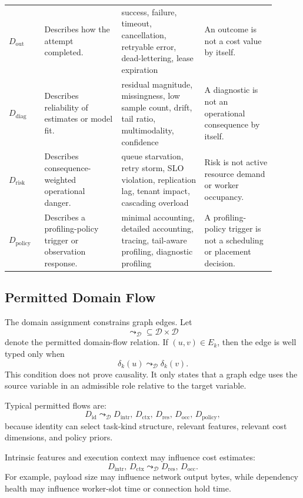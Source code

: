 \begin{longtable}{
p{0.12\linewidth}
p{0.26\linewidth}
p{0.28\linewidth}
p{0.24\linewidth}
}
$D_{\mathrm{out}}$ &
Describes how the attempt completed. &
success, failure, timeout, cancellation, retryable error, dead-lettering, lease
expiration &
An outcome is not a cost value by itself. \\

$D_{\mathrm{diag}}$ &
Describes reliability of estimates or model fit. &
residual magnitude, missingness, low sample count, drift, tail ratio,
multimodality, confidence &
A diagnostic is not an operational consequence by itself. \\

$D_{\mathrm{risk}}$ &
Describes consequence-weighted operational danger. &
queue starvation, retry storm, SLO violation, replication lag, tenant impact,
cascading overload &
Risk is not active resource demand or worker occupancy. \\

$D_{\mathrm{policy}}$ &
Describes a profiling-policy trigger or observation response. &
minimal accounting, detailed accounting, tracing, tail-aware profiling,
diagnostic profiling &
A profiling-policy trigger is not a scheduling or placement decision. \\

\end{longtable}
\endgroup

\subsection{Permitted Domain Flow}
\label{sec:influence-domain-flow}

The domain assignment constrains graph edges. Let
\[
\leadsto_{\mathcal{D}}
\subseteq
\mathcal{D}\times\mathcal{D}
\]
denote the permitted domain-flow relation. If $(u,v)\in E_k$, then the edge is
well typed only when
\[
\delta_k(u)\leadsto_{\mathcal{D}}\delta_k(v).
\]
This condition does not prove causality. It only states that a graph edge uses
the source variable in an admissible role relative to the target variable.

Typical permitted flows are:
\[
D_{\mathrm{id}}
\leadsto_{\mathcal{D}}
D_{\mathrm{intr}},\,
D_{\mathrm{ctx}},\,
D_{\mathrm{res}},\,
D_{\mathrm{occ}},\,
D_{\mathrm{policy}},
\]
because identity can select task-kind structure, relevant features, relevant
cost dimensions, and policy priors.

Intrinsic features and execution context may influence cost estimates:
\[
D_{\mathrm{intr}},\,D_{\mathrm{ctx}}
\leadsto_{\mathcal{D}}
D_{\mathrm{res}},\,D_{\mathrm{occ}}.
\]
For example, payload size may influence network output bytes, while dependency
health may influence worker-slot time or connection hold time.

